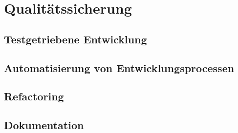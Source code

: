 \chapter{Qualitätssicherung}

\section{Testgetriebene Entwicklung}

\section{Automatisierung von Entwicklungsprocessen}

\section{Refactoring}

\section{Dokumentation}
